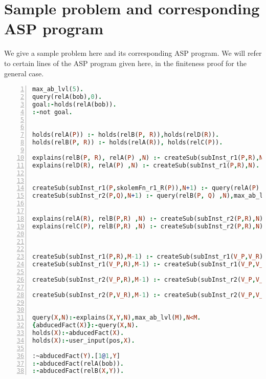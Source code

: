 \documentclass{article}
\begin{document}
\section{Sample problem and corresponding ASP program}\label{sec:sample_problem}
We give a sample problem here and its corresponding ASP program. We will refer to certain lines of the ASP program given here, in the finiteness proof for the general case. 
\begin{lstlisting}[language=Prolog, numbers=left]
max_ab_lvl(5).
query(relA(bob),0).
goal:-holds(relA(bob)).
:-not goal.


holds(relA(P)) :- holds(relB(P, R)),holds(relD(R)).
holds(relB(P, R)) :- holds(relA(R)), holds(relC(P)).

explains(relB(P, R), relA(P) ,N) :- createSub(subInst_r1(P,R),N).
explains(relD(R), relA(P) ,N) :- createSub(subInst_r1(P,R),N).


createSub(subInst_r1(P,skolemFn_r1_R(P)),N+1) :- query(relA(P) ,N),max_ab_lvl(M),N<M-1.
createSub(subInst_r2(P,Q),N+1) :- query(relB(P, Q) ,N),max_ab_lvl(M),N<M-1.


explains(relA(R), relB(P,R) ,N) :- createSub(subInst_r2(P,R),N).
explains(relC(P), relB(P,R) ,N) :- createSub(subInst_r2(P,R),N).



createSub(subInst_r1(P,R),M-1) :- createSub(subInst_r1(V_P,V_R),N), holds(relB(P, R)),max_ab_lvl(M).
createSub(subInst_r1(V_P,R),M-1) :- createSub(subInst_r1(V_P,V_R),N), holds(relD(R)),max_ab_lvl(M).

createSub(subInst_r2(V_P,R),M-1) :- createSub(subInst_r2(V_P,V_R),N), holds(relA(R)),max_ab_lvl(M).

createSub(subInst_r2(P,V_R),M-1) :- createSub(subInst_r2(V_P,V_R),N), holds(relC(P)),max_ab_lvl(M).


query(X,N):-explains(X,Y,N),max_ab_lvl(M),N<M.
{abducedFact(X)}:-query(X,N).
holds(X):-abducedFact(X).
holds(X):-user_input(pos,X).

:~abducedFact(Y).[1@1,Y]
:-abducedFact(relA(bob)).
:-abducedFact(relB(X,Y)).

\end{lstlisting}
\end{document}
